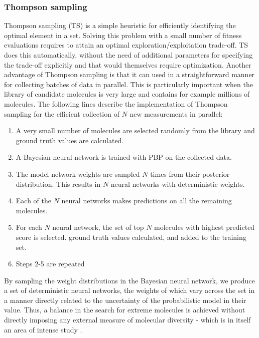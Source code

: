\subsubsection{Thompson sampling}

Thompson sampling (TS) \cite{Thompson_1933} is a simple heuristic for efficiently identifying the optimal element in a set. Solving this problem with a small number of fitness evaluations requires to attain an optimal exploration/exploitation trade-off. TS does this automatically, without the need of additional parameters for specifying the trade-off explicitly and that would themselves require optimization. Another advantage of Thompson sampling is that it can used in a straightforward manner for collecting batches of data in parallel. This is 
particularly important when the library of candidate molecules is very large and contains for example millions of molecules.
The following lines describe the implementation of Thompson sampling for the efficient collection of $N$ new measurements in parallel:
\begin{enumerate}
\item A very small number of molecules are selected randomly from the library and ground truth values are calculated.
\item A Bayesian neural network is trained with PBP on the collected data.
\item The model network weights are sampled $N$ times from their posterior distribution. This results in $N$ neural networks with deterministic weights.
\item Each of the $N$ neural networks makes predictions on all the remaining molecules.
\item For each $N$ neural network, the set of top $N$ molecules with highest predicted score is selected.
ground truth values calculated, and added to the training set.
\item Steps 2-5 are repeated
\end{enumerate}
By sampling the weight distributions in the Bayesian neural network, we produce a set of deterministic neural networks, the weights of which vary across the set in a manner directly related to the uncertainty of the probabilistic model in their value.  Thus, a balance in the search for extreme molecules is achieved without directly imposing any external measure of molecular diversity - which is in itself an area of intense study \cite{Maldonado_2006}.